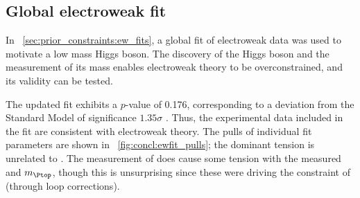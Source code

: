 
\subsection{Global electroweak fit}
\label{sec:implications:ewfit}

In \Section~\ref{sec:prior_constraints:ew_fits}, a global fit of electroweak data was used 
to motivate a low mass Higgs boson. The discovery of the Higgs boson and the measurement 
of its mass enables electroweak theory to be overconstrained, and its validity can be 
tested. 

The updated fit exhibits a $p$-value of 0.176, corresponding to a deviation from the 
Standard Model of significance $1.35\sigma$ \cite{Gfitter:2013}. Thus, the experimental 
data included in the fit are consistent with electroweak theory. The pulls of individual 
fit parameters are shown in \Figure~\ref{fig:concl:ewfit_pulls}; the dominant tension is 
unrelated to \mH. The measurement of \mH does cause some tension with the measured \mW and 
$m_{\Ptop}$, though this is unsurprising since these were driving the constraint of \mH 
(through loop corrections).

